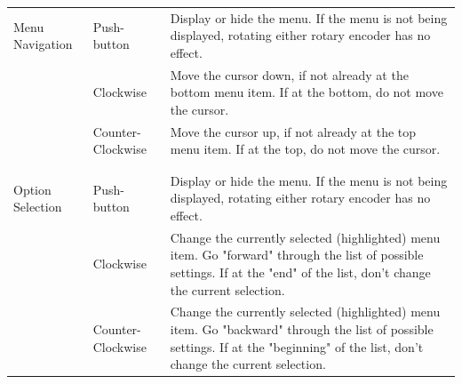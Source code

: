 \documentclass{scrartcl}
\begin{document}
	\begin{center}
    		\begin{tabular}{ p{3cm} p{3cm} p{10cm} }
		 Menu Navigation & Push-button & Display or hide the menu. If the menu is not being displayed, rotating either rotary encoder has no effect. \\
		 & Clockwise & Move the cursor down, if not already at the bottom menu item. If at the bottom, do not move the cursor.  \\
		 & Counter-Clockwise & Move the cursor up, if not already at the top menu item. If at the top, do not move the cursor. \\
		\\ \hline \\
		Option Selection & Push-button & Display or hide the menu. If the menu is not being displayed, rotating either rotary encoder has no effect. \\
		 & Clockwise & Change the currently selected (highlighted) menu item. Go "forward" through the list of possible settings. If at the "end" of the list, don't change the current selection. \\
		 & Counter-Clockwise & Change the currently selected (highlighted) menu item. Go "backward" through the list of possible settings. If at the "beginning" of the list, don't change the current selection. \\
		\end{tabular}
	\end{center}

	
	
\end{document}
